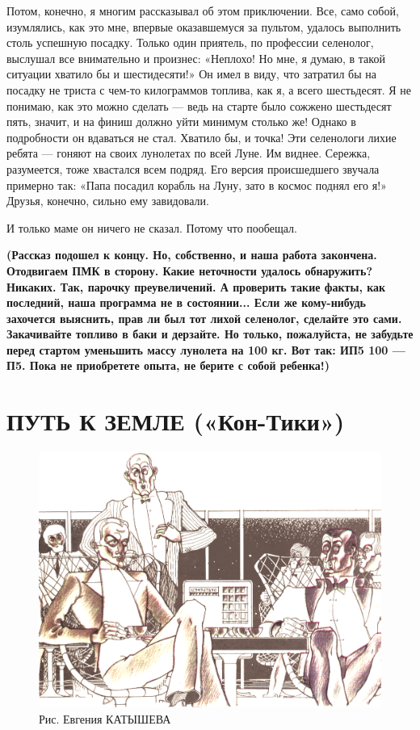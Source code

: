\documentclass[11pt,a4paper,oneside]{article}
\begin{document}
Потом, конечно, я многим рассказывал об этом приключении. Все, само собой, изумлялись, как это мне, впервые оказавшемуся за пультом, удалось выполнить столь успешную посадку. Только один приятель, по профессии селенолог, выслушал все внимательно и произнес: «Неплохо! Но мне, я думаю, в такой ситуации хватило бы и шестидесяти!» Он имел в виду, что затратил бы на посадку не триста с чем-то килограммов топлива, как я, а всего шестьдесят. Я не понимаю, как это можно сделать — ведь на старте было сожжено шестьдесят пять, значит, и на финиш должно уйти минимум столько же! Однако в подробности он вдаваться не стал. Хватило бы, и точка! Эти селенологи лихие ребята — гоняют на своих лунолетах по всей Луне. Им виднее.
Сережка, разумеется, тоже хвастался всем подряд. Его версия происшедшего звучала примерно так: «Папа посадил корабль на Луну, зато в космос поднял его я!» Друзья, конечно, сильно ему завидовали.

И только маме он ничего не сказал. Потому что пообещал.

\textbf{
(Рассказ подошел к концу. Но, собственно, и наша работа закончена. Отодвигаем ПМК в сторону. Какие неточности удалось обнаружить? Никаких. Так, парочку преувеличений. А проверить такие факты, как последний, наша программа не в состоянии...
Если же кому-нибудь захочется выяснить, прав ли был тот лихой селенолог, сделайте это сами. Закачивайте топливо в баки и дерзайте. Но только, пожалуйста, не забудьте перед стартом уменьшить массу лунолета на 100 кг. Вот так: ИП5 100 — П5. Пока не приобретете опыта, не берите с собой ребенка!)}

\section{ПУТЬ К ЗЕМЛЕ («Кон-Тики»)}

\begin{figure}[H]
\includegraphics[width=\textwidth]{way_to_the_earth}
\caption{Рис. Евгения КАТЫШЕВА}
\end{figure}
\end{document}
